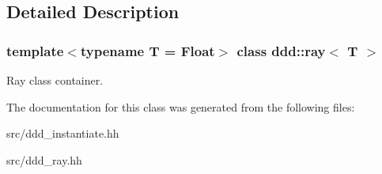 \subsection{Detailed Description}
\subsubsection*{template$<$typename T = Float$>$\newline
class ddd\+::ray$<$ T $>$}

Ray class container. 

The documentation for this class was generated from the following files\+:\begin{DoxyCompactItemize}
\item 
src/ddd\+\_\+instantiate.\+hh\item 
src/ddd\+\_\+ray.\+hh\end{DoxyCompactItemize}
